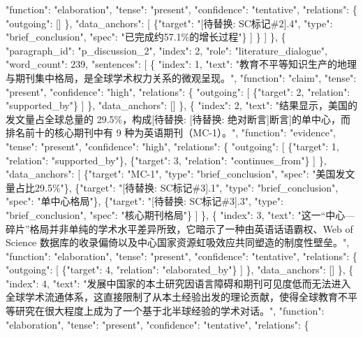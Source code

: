 \documentclass[12pt,a4paper]{article}
\begin{document}
          "function": "elaboration",
          "tense": "present",
          "confidence": "tentative",
          "relations": \{
            "outgoing": []
          \},
          "data\_anchors": [
            \{"target": "[待替换: SC标记\#2].4", "type": "brief\_conclusion", "spec": "已完成约57.1\%的增长过程"\}
          ]
        \}
      ]
    \},
    \{
      "paragraph\_id": "p\_discussion\_2",
      "index": 2,
      "role": "literature\_dialogue",
      "word\_count": 239,
      "sentences": [
        \{
          "index": 1,
          "text": "教育不平等知识生产的地理与期刊集中格局，是全球学术权力关系的微观呈现。",
          "function": "claim",
          "tense": "present",
          "confidence": "high",
          "relations": \{
            "outgoing": [
              \{"target": 2, "relation": "supported\_by"\}
            ]
          \},
          "data\_anchors": []
        \},
        \{
          "index": 2,
          "text": "结果显示，美国的发文量占全球总量的 29.5\%，构成[待替换: [待替换: 绝对断言]断言]的单中心，而排名前十的核心期刊中有 9 种为英语期刊（MC-1）。",
          "function": "evidence",
          "tense": "present",
          "confidence": "high",
          "relations": \{
            "outgoing": [
              \{"target": 1, "relation": "supported\_by"\},
              \{"target": 3, "relation": "continues\_from"\}
            ]
          \},
          "data\_anchors": [
            \{"target": "MC-1", "type": "brief\_conclusion", "spec": "美国发文量占比29.5\%"\},
            \{"target": "[待替换: SC标记\#3].1", "type": "brief\_conclusion", "spec": "单中心格局"\},
            \{"target": "[待替换: SC标记\#3].3", "type": "brief\_conclusion", "spec": "核心期刊格局"\}
          ]
        \},
        \{
          "index": 3,
          "text": "这一“中心—碎片”格局并非单纯的学术水平差异所致，它暗示了一种由英语话语霸权、Web of Science 数据库的收录偏倚以及中心国家资源虹吸效应共同塑造的制度性壁垒。",
          "function": "elaboration",
          "tense": "present",
          "confidence": "tentative",
          "relations": \{
            "outgoing": [
              \{"target": 4, "relation": "elaborated\_by"\}
            ]
          \},
          "data\_anchors": []
        \},
        \{
          "index": 4,
          "text": "发展中国家的本土研究因语言障碍和期刊可见度低而无法进入全球学术流通体系，这直接限制了从本土经验出发的理论贡献，使得全球教育不平等研究在很大程度上成为了一个基于北半球经验的学术对话。",
          "function": "elaboration",
          "tense": "present",
          "confidence": "tentative",
          "relations": \{
\end{document}
